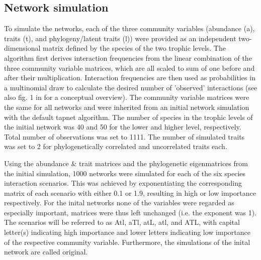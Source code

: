 \documentclass[12pt,a4paper]{article}
\begin{document}
	\subsection{Network simulation} \label{sec:net_sim}
To simulate the networks, each of the three community variables (abundance (a), traits (t), and phylogeny/latent traits (l)) were provided as an independent two-dimensional matrix defined by the species of the two trophic levels. The algorithm first derives interaction frequencies from the linear combination of the three community variable matrices, which are all scaled to sum of one before and after their multiplication. Interaction frequencies are then used as probabilities in a multinomial draw to calculate the desired number of 'observed' interactions (see also fig. 1 in \cite{Benadi} for a conceptual overview).	 The community variable matrices were the same for all networks and were inherited from an initial network simulation with the default tapnet algorithm. The number of species in the trophic levels of the initial network was 40 and 50 for the lower and higher level, respectively. Total number of observations was set to 1111. The number of simulated traits was set to 2 for phylogenetically correlated and uncorrelated traits each.\par
	

	Using the abundance \& trait matrices and the phylogenetic eigenmatrices from the initial simulation, 1000 networks were simulated for each of the six species interaction scenarios. This was achieved by exponentiating the corresponding matrix of each scenario with either 0.1 or 1.9, resulting in high or low importance respectively. For the inital networks none of the variables were regarded as especially important, matrices were thus left unchanged (i.e. the exponent was 1). The scenarios will be referred to as Atl, aTl, atL, atl, and ATL, with capital letter(s) indicating high importance and lower letters indicating low importance of the respective community variable. Furthermore, the simulations of the inital network are called original.\par
	
\end{document}
